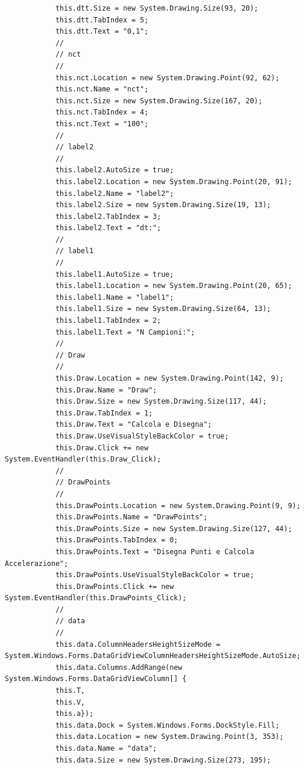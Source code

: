 \documentclass[11pt]{article} %
\begin{document}
\begin{lstlisting}
            this.dtt.Size = new System.Drawing.Size(93, 20);
            this.dtt.TabIndex = 5;
            this.dtt.Text = "0,1";
            // 
            // nct
            // 
            this.nct.Location = new System.Drawing.Point(92, 62);
            this.nct.Name = "nct";
            this.nct.Size = new System.Drawing.Size(167, 20);
            this.nct.TabIndex = 4;
            this.nct.Text = "100";
            // 
            // label2
            // 
            this.label2.AutoSize = true;
            this.label2.Location = new System.Drawing.Point(20, 91);
            this.label2.Name = "label2";
            this.label2.Size = new System.Drawing.Size(19, 13);
            this.label2.TabIndex = 3;
            this.label2.Text = "dt:";
            // 
            // label1
            // 
            this.label1.AutoSize = true;
            this.label1.Location = new System.Drawing.Point(20, 65);
            this.label1.Name = "label1";
            this.label1.Size = new System.Drawing.Size(64, 13);
            this.label1.TabIndex = 2;
            this.label1.Text = "N Campioni:";
            // 
            // Draw
            // 
            this.Draw.Location = new System.Drawing.Point(142, 9);
            this.Draw.Name = "Draw";
            this.Draw.Size = new System.Drawing.Size(117, 44);
            this.Draw.TabIndex = 1;
            this.Draw.Text = "Calcola e Disegna";
            this.Draw.UseVisualStyleBackColor = true;
            this.Draw.Click += new System.EventHandler(this.Draw_Click);
            // 
            // DrawPoints
            // 
            this.DrawPoints.Location = new System.Drawing.Point(9, 9);
            this.DrawPoints.Name = "DrawPoints";
            this.DrawPoints.Size = new System.Drawing.Size(127, 44);
            this.DrawPoints.TabIndex = 0;
            this.DrawPoints.Text = "Disegna Punti e Calcola Accelerazione";
            this.DrawPoints.UseVisualStyleBackColor = true;
            this.DrawPoints.Click += new System.EventHandler(this.DrawPoints_Click);
            // 
            // data
            // 
            this.data.ColumnHeadersHeightSizeMode = System.Windows.Forms.DataGridViewColumnHeadersHeightSizeMode.AutoSize;
            this.data.Columns.AddRange(new System.Windows.Forms.DataGridViewColumn[] {
            this.T,
            this.V,
            this.a});
            this.data.Dock = System.Windows.Forms.DockStyle.Fill;
            this.data.Location = new System.Drawing.Point(3, 353);
            this.data.Name = "data";
            this.data.Size = new System.Drawing.Size(273, 195);

\end{lstlisting}
\end{document}
